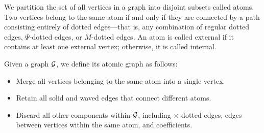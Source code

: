 
\begin{definition}\label{def_atom}
We partition the set of all vertices in a graph into disjoint subsets called atoms. Two vertices belong to the same atom if and only if they are connected by a path consisting entirely of dotted edges---that is, any combination of regular dotted edges, $\Psi$-dotted edges, or $M$-dotted edges.
An atom is called external if it contains at least one external vertex; otherwise, it is called internal. 

Given a graph $\cal G$, we define its atomic graph as follows:
\begin{itemize}
\item Merge all vertices belonging to the same atom into a single vertex. 
		
\item Retain all solid and waved edges that connect different atoms. 
		
\item Discard all other components within $\cal G$, including $\times$-dotted edges, edges between vertices within the same atom, and coefficients.
\end{itemize}
\end{definition}

